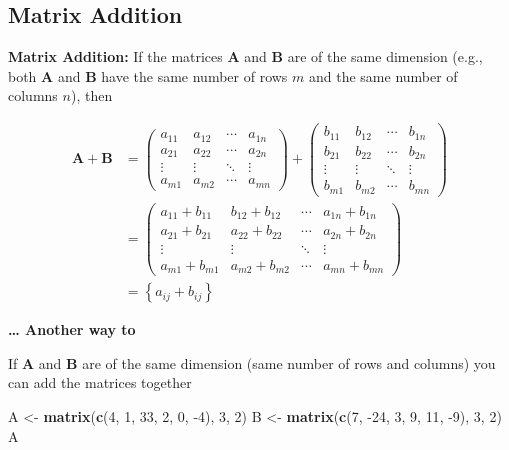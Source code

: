 \documentclass[
]{book}
\newenvironment{Shaded}{\begin{snugshade}}{\end{snugshade}}
\newcommand{\DecValTok}[1]{\textcolor[rgb]{0.00,0.00,0.81}{#1}}
\newcommand{\KeywordTok}[1]{\textcolor[rgb]{0.13,0.29,0.53}{\textbf{#1}}}
\newcommand{\NormalTok}[1]{#1}
\newcommand{\StringTok}[1]{\textcolor[rgb]{0.31,0.60,0.02}{#1}}
\theoremstyle{definition}
\theoremstyle{definition}
\theoremstyle{definition}
\theoremstyle{remark}
\begin{document}
\hypertarget{matrix-addition}{%
\subsection{Matrix Addition}\label{matrix-addition}}

\textbf{Matrix Addition:} If the matrices \(\mathbf{A}\) and \(\mathbf{B}\) are of the same dimension (e.g., both \(\mathbf{A}\) and \(\mathbf{B}\) have the same number of rows \(m\) and the same number of columns \(n\)), then

\[
\begin{aligned}
\mathbf{A} + \mathbf{B} & = \begin{pmatrix} a_{11} & a_{12} & \cdots & a_{1n} \\
a_{21} & a_{22} & \cdots & a_{2n} \\
\vdots & \vdots & \ddots & \vdots \\
a_{m1} & a_{m2} & \cdots & a_{mn}
\end{pmatrix} + 
\begin{pmatrix} b_{11} & b_{12} & \cdots & b_{1n} \\
b_{21} & b_{22} & \cdots & b_{2n} \\
\vdots & \vdots & \ddots & \vdots \\
b_{m1} & b_{m2} & \cdots & b_{mn}
\end{pmatrix} \\
& = \begin{pmatrix} a_{11} + b_{11} & b_{12} + b_{12} & \cdots & a_{1n} + b_{1n} \\
a_{21} + b_{21} & a_{22} + b_{22} & \cdots & a_{2n} + b_{2n} \\
\vdots & \vdots & \ddots & \vdots \\
a_{m1} + b_{m1} & a_{m2} + b_{m2} & \cdots & a_{mn} + b_{mn}
\end{pmatrix} \\
& = \left\{ a_{ij} + b_{ij} \right\}
\end{aligned}
\label{eq:matrix-addition}
\]

\textbf{\ldots{} Another way to }

If \(\mathbf{A}\) and \(\mathbf{B}\) are of the same dimension (same number of rows and columns) you can add the matrices together

\begin{Shaded}
\begin{Highlighting}[]
\NormalTok{A <-}\StringTok{ }\KeywordTok{matrix}\NormalTok{(}\KeywordTok{c}\NormalTok{(}\DecValTok{4}\NormalTok{, }\DecValTok{1}\NormalTok{, }\DecValTok{33}\NormalTok{, }\DecValTok{2}\NormalTok{, }\DecValTok{0}\NormalTok{, }\DecValTok{-4}\NormalTok{), }\DecValTok{3}\NormalTok{, }\DecValTok{2}\NormalTok{)}
\NormalTok{B <-}\StringTok{ }\KeywordTok{matrix}\NormalTok{(}\KeywordTok{c}\NormalTok{(}\DecValTok{7}\NormalTok{, }\DecValTok{-24}\NormalTok{, }\DecValTok{3}\NormalTok{, }\DecValTok{9}\NormalTok{, }\DecValTok{11}\NormalTok{, }\DecValTok{-9}\NormalTok{), }\DecValTok{3}\NormalTok{, }\DecValTok{2}\NormalTok{)}
\NormalTok{A}
\end{Highlighting}
\end{Shaded}
\end{document}
